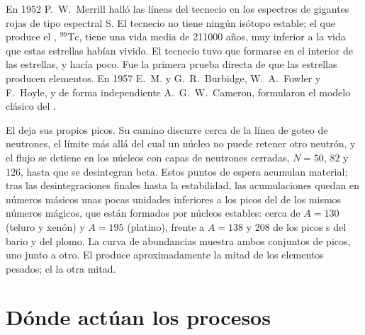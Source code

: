 \begin{history}
En 1952 P.~W.~Merrill halló las líneas del tecnecio en los espectros de
gigantes rojas de tipo espectral S. El tecnecio no tiene ningún isótopo estable; el que
produce el , $^{99}\mathrm{Tc}$, tiene una vida media de
\num{211000} años, muy inferior a la vida que estas estrellas
habían vivido. El tecnecio tuvo que formarse en el interior de las estrellas, y
hacía poco. Fue la primera prueba directa de que las estrellas producen elementos. En
1957 E.~M. y G.~R.~Burbidge, W.~A.~Fowler y F.~Hoyle, y
de forma independiente A.~G.~W.~Cameron, formularon el modelo clásico del
.
\end{history}

El  deja sus propios picos. Su camino discurre cerca de la línea de goteo
de neutrones, el límite más allá del cual un núcleo no puede retener otro neutrón,
y el flujo se detiene en los núcleos con capas de neutrones cerradas, $N = 50$, $82$ y
$126$, hasta que se desintegran beta. Estos puntos de espera acumulan material;
tras las desintegraciones finales hasta la estabilidad, las acumulaciones quedan en números másicos unas pocas
unidades inferiores a los picos del  de los mismos números mágicos, que
están formados por núcleos estables: cerca de $A = 130$ (teluro y xenón) y
$A = 195$ (platino), frente a $A = 138$ y $208$ de los picos s del
bario y del plomo. La curva de abundancias muestra ambos conjuntos de picos, uno junto a
otro. El  produce aproximadamente la mitad de los elementos pesados; el 
la otra mitad.

\section{Dónde actúan los procesos}\label{sec:b3:origin-of-elements:sites}

